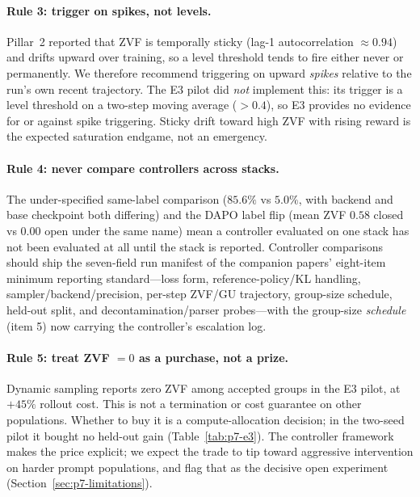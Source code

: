 \paragraph{Rule 3: trigger on spikes, not levels.} Pillar~2 reported
that ZVF is temporally sticky (lag-1 autocorrelation $\approx 0.94$) and
drifts upward over training, so a level threshold tends to fire either never
or permanently. We therefore recommend triggering on upward \emph{spikes}
relative to the run's own recent trajectory. The E3 pilot did \emph{not}
implement this: its trigger is a level threshold on a two-step moving average
($>0.4$), so E3 provides no evidence for or against spike triggering. Sticky
drift toward high ZVF with rising reward is the expected saturation endgame,
not an emergency.

\paragraph{Rule 4: never compare controllers across stacks.} The
under-specified same-label comparison ($85.6\%$ vs $5.0\%$, with backend and
base checkpoint both differing) and the DAPO label flip (mean ZVF $0.58$
closed vs $0.00$ open under
the same name) mean a controller evaluated on one stack has not been
evaluated at all until the stack is reported. Controller comparisons should
ship the seven-field run manifest of the companion papers' eight-item
minimum reporting standard---loss form,
reference-policy/KL handling, sampler/backend/precision, per-step ZVF/GU
trajectory, group-size schedule, held-out split, and
decontamination/parser probes---with the group-size \emph{schedule} (item
5) now carrying the controller's escalation log.

\paragraph{Rule 5: treat ZVF $= 0$ as a purchase, not a prize.} Dynamic
sampling reports zero ZVF among accepted groups in the E3 pilot,
at $+45\%$ rollout cost. This is not a termination or cost guarantee
on other populations. Whether to buy it is a compute-allocation
decision; in the two-seed pilot it bought no held-out gain
(Table~\ref{tab:p7-e3}). The controller framework makes the price explicit;
we expect the trade to tip toward aggressive intervention on harder prompt
populations, and flag that as the decisive open experiment
(Section~\ref{sec:p7-limitations}).

